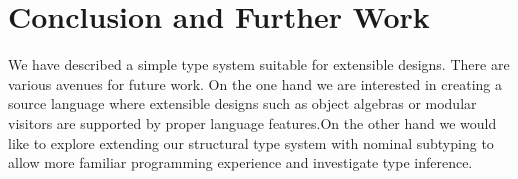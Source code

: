 \section{Conclusion and Further Work}

We have described a simple type system suitable for extensible
designs.   There are
various avenues for future work. On the one hand we are interested in
creating a source language where extensible designs such as object
algebras or modular visitors are supported by proper language
features.On the other hand we would like to explore extending our
structural type system with nominal subtyping to allow more familiar
programming experience and investigate type inference.
